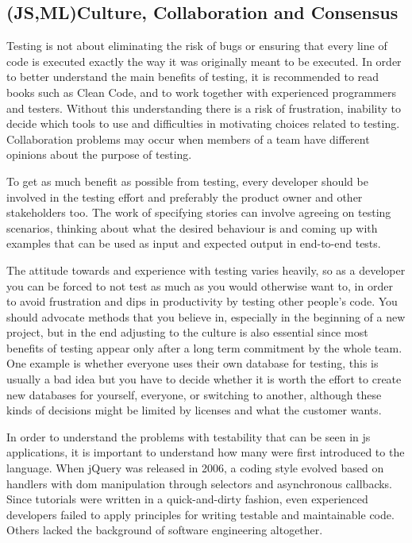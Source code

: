 \documentclass[11pt]{article}
\begin{document}
\subsection{(JS,ML)Culture, Collaboration and Consensus}
\label{subsec:ccc}

Testing is not about eliminating the risk of bugs or ensuring that every line of code is executed exactly the way it was originally meant to be executed. In order to better understand the main benefits of testing, it is recommended to read books such as Clean Code\cite{Clean}, and to work together with experienced programmers and testers. Without this understanding there is a risk of frustration, inability to decide which tools to use and difficulties in motivating choices related to testing. Collaboration problems may occur when members of a team have different opinions about the purpose of testing. \cite[question~38]{Edelstam}

To get as much benefit as possible from testing, every developer should be involved in the testing effort and preferably the product owner and other stakeholders too. The work of specifying stories can involve agreeing on testing scenarios, thinking about what the desired behaviour is and coming up with examples that can be used as input and expected output in end-to-end tests. \cite[questions~39-40]{Edelstam}\cite[question~30]{Stenmark}

The attitude towards and experience with testing varies heavily, so as a developer you can be forced to not test as much as you would otherwise want to, in order to avoid frustration and dips in productivity by testing other people's code. You should advocate methods that you believe in, especially in the beginning of a new project, but in the end adjusting to the culture is also essential since most benefits of testing appear only after a long term commitment by the whole team. One example is whether everyone uses their own database for testing, this is usually a bad idea but you have to decide whether it is worth the effort to create new databases for yourself, everyone, or switching to another, although these kinds of decisions might be limited by licenses and what the customer wants. \cite[questions~31-32]{Stenmark}\cite[question~36]{Ahnve}

In order to understand the problems with testability that can be seen in \gls{js} applications, it is important to understand how many were first introduced to the language. When jQuery was released in 2006, a coding style evolved based on handlers with \gls{dom} manipulation through selectors and asynchronous callbacks. Since tutorials were written in a quick-and-dirty fashion, even experienced developers failed to apply principles for writing testable and maintainable code. Others lacked the background of software engineering altogether. \cite[question~10]{Stenmark}
\end{document}
